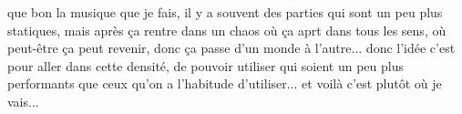 que bon la musique que je fais, il y a souvent des parties qui sont un peu plus statiques, mais après ça rentre dans un chaos où ça aprt dans tous les sens, où peut-être ça peut revenir, donc ça passe d'un monde à l'autre... donc l'idée c'est pour aller dans cette densité, de pouvoir utiliser qui soient un peu plus performants que ceux qu'on a l'habitude d'utiliser... et voilà c'est plutôt où je vais... 




